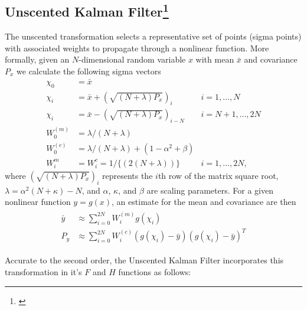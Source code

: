 \begin{appendices}
\chapter{Unscented Kalman Filter\footnote{\citet{Wan00theunscented}}}\label{ch:append-ukf}
The unscented transformation selects a representative set of points (sigma points) with associated weights to propagate through a nonlinear function. More formally, given an $N$-dimensional random variable $x$ with mean $\bar{x}$ and covariance $P_x$ we calculate the following sigma vectors 
\begin{equation}\label{eq:unscentedtransform}
\begin{aligned}
  \chi_0 &= \bar{x}\\
  \chi_i &= \bar{x} + (\sqrt{(N + \lambda)P_x})_i & i = 1, ..., N \\
  \chi_i &= \bar{x} - (\sqrt{(N + \lambda)P_x})_{i-N} & i = N + 1, ..., 2N\\
  W_0^{(m)} &= \lambda /(N + \lambda) \\
  W_0^{(c)} &= \lambda /(N + \lambda) + (1- \alpha^2 + \beta)\\
  W_i^m &= W_i^c = 1/\{(2(N + \lambda))\} & i = 1, ..., 2N,
\end{aligned}
\end{equation}
where $(\sqrt{(N + \lambda)P_x})_i$ represents the $i$th row of the matrix square root, $\lambda = \alpha^2(N + \kappa) - N$, and $\alpha$, $\kappa$, and $\beta$ are scaling parameters. For a given nonlinear function $y=g(x)$, an estimate for the mean and covariance are then
\begin{align}
\begin{split}
  \bar{y} &\approx \sum_{i=0}^{2N} W_i^{(m)}g(\chi_i)\\
  P_y &\approx \sum_{i=0}^{2N} W_i^{(c)}(g(\chi_i) - \bar{y})(g(\chi_i) - \bar{y})^T
\end{split}
\end{align}

Accurate to the second order, the Unscented Kalman Filter incorporates this transformation in it's $F$ and $H$ functions as follows:


\end{appendices}
